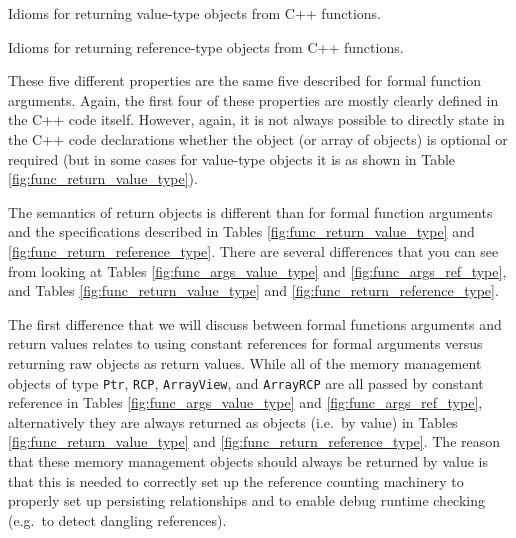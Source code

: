 \documentclass[pdf,ps2pdf,11pt]{SANDreport}
\begin{document}
\begin{table}[p]
%
\begin{center}
%
%

%
%
%
\end{center}
\caption{\label{fig:func_return_value_type}
Idioms for returning value-type objects from C++ functions.}
%
\end{table}


\begin{table}[p]
%
\begin{center}
%
%

%
%
%
\end{center}
\caption{\label{fig:func_return_reference_type}
Idioms for returning reference-type objects from C++ functions.}
%
\end{table}


These five different properties are the same five described for formal
function arguments.  Again, the first four of these properties are
mostly clearly defined in the C++ code itself.  However, again, it is
not always possible to directly state in the C++ code declarations
whether the object (or array of objects) is optional or required (but
in some cases for value-type objects it is as shown in Table
{}\ref{fig:func_return_value_type}).

The semantics of return objects is different than for formal function
arguments and the specifications described in Tables
{}\ref{fig:func_return_value_type} and
{}\ref{fig:func_return_reference_type}.  There are several differences
that you can see from looking at Tables
{}\ref{fig:func_args_value_type} and {}\ref{fig:func_args_ref_type},
and Tables {}\ref{fig:func_return_value_type} and
{}\ref{fig:func_return_reference_type}.

The first difference that we will discuss between formal functions
arguments and return values relates to using constant references for
formal arguments versus returning raw objects as return values.  While
all of the memory management objects of type {}\texttt{Ptr},
{}\texttt{RCP}, {}\texttt{ArrayView}, and {}\texttt{ArrayRCP} are all
passed by constant reference in Tables
{}\ref{fig:func_args_value_type} and {}\ref{fig:func_args_ref_type},
alternatively they are always returned as objects (i.e.\ by value) in
Tables {}\ref{fig:func_return_value_type} and
{}\ref{fig:func_return_reference_type}.  The reason that these memory
management objects should always be returned by value is that this is
needed to correctly set up the reference counting machinery to
properly set up persisting relationships and to enable debug runtime
checking (e.g.\ to detect dangling references).
\end{document}
